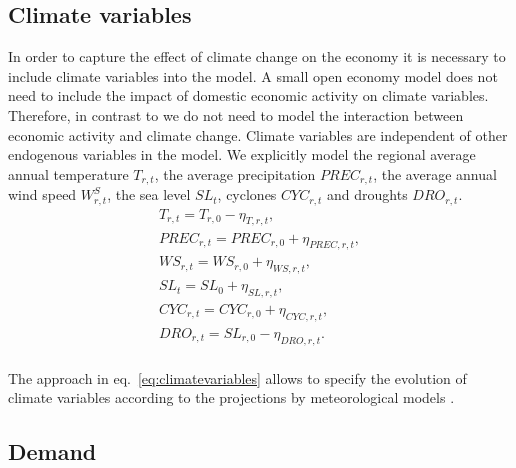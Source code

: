 \documentclass[10pt,a4paper]{article}
\begin{document}
\subsection{Climate variables}
In order to capture the effect of climate change on the economy it is necessary to include climate variables into the model. A small open economy model does not need to include the impact of domestic economic activity on climate variables. Therefore, in contrast to \cite{nordhaus1993optimal} we do not need to model the interaction between economic activity and climate change. Climate variables are independent of other endogenous variables in the model. We explicitly model the regional average annual temperature $T_{r,t}$, the average precipitation $PREC_{r,t}$, the average annual wind speed $W^S_{r,t}$, the sea level $SL_{t}$, cyclones $CYC_{r,t}$ and droughts $DRO_{r,t}$. 
\begin{align}\label{eq:climatevariables}
T_{r,t} = T_{r,0} - \eta_{T,r,t}, \nonumber \\
PREC_{r,t} = PREC_{r,0} + \eta_{PREC,r,t}, \nonumber \\
WS_{r,t} = WS_{r,0} + \eta_{WS,r,t}, \nonumber \\
SL_{t} = SL_{0} + \eta_{SL,r,t}, \nonumber \\
CYC_{r,t} = CYC_{r,0} + \eta_{CYC,r,t}, \nonumber \\
DRO_{r,t} = SL_{r,0} - \eta_{DRO,r,t}. \nonumber \\
\end{align}

The approach in eq.~\ref{eq:climatevariables} allows to specify the evolution of climate variables according to the projections by meteorological models \citep[e.g.][]{stocker2013climate}.

\subsection{Demand}
\end{document}
